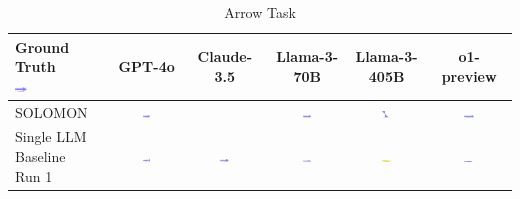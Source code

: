 \begin{table}
  \caption{Arrow Task}
  \label{table:arrow}
  \centering
  \begin{tabular}{@{}lccccc@{}}
    \toprule
    \makecell{Ground Truth \\ \includegraphics[width=0.13\textwidth]{examples_png/Arrow.png}} & GPT-4o & Claude-3.5 & Llama-3-70B & Llama-3-405B & o1-preview \\
    \midrule
    SOLOMON & \includegraphics[width=0.13\textwidth]{./pool_all/png/gpt-4o_results/Arrow.png} &  & \includegraphics[width=0.13\textwidth]{./pool_all/png/claude-3-5-sonnet-20240620_results/Arrow.png} & \includegraphics[width=0.13\textwidth]{./pool_all/png/watsonx_meta-llama_llama-3-1-70b-instruct_results/Arrow.png} & \includegraphics[width=0.13\textwidth]{./pool_all/png/watsonx_meta-llama_llama-3-405b-instruct_results/Arrow.png} \\
    \makecell{Single LLM \\ Baseline \\ Run 1} & \includegraphics[width=0.13\textwidth]{./run_1/png/gpt-4o_results/Arrow.png} & \includegraphics[width=0.13\textwidth]{./run_1/png/o1-preview_results/Arrow.png} & \includegraphics[width=0.13\textwidth]{./run_1/png/claude-3-5-sonnet-20240620_results/Arrow.png} & \includegraphics[width=0.13\textwidth]{./run_1/png/watsonx_meta-llama_llama-3-1-70b-instruct_results/Arrow.png} & \includegraphics[width=0.13\textwidth]{./run_1/png/watsonx_meta-llama_llama-3-405b-instruct_results/Arrow.png} \\

\end{tabular}
\end{table}
